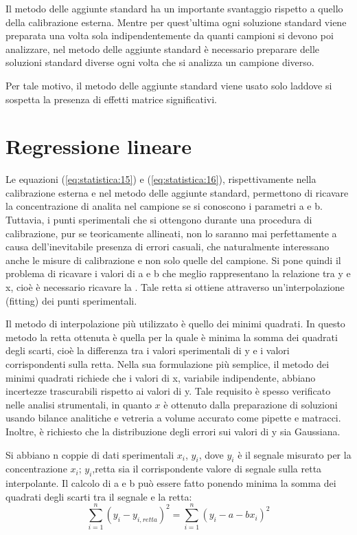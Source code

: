 Il metodo delle aggiunte standard ha un importante svantaggio rispetto a quello della calibrazione esterna. Mentre per quest'ultima ogni soluzione standard viene preparata una volta sola indipendentemente da quanti campioni si devono poi analizzare, nel metodo delle aggiunte standard è necessario preparare delle soluzioni standard diverse ogni volta che si analizza un campione diverso.

Per tale motivo, il metodo delle aggiunte standard viene usato solo laddove si sospetta la presenza di effetti matrice significativi.

\section{Regressione lineare}

Le equazioni (\ref{eq:statistica:15}) e (\ref{eq:statistica:16}), rispettivamente nella calibrazione esterna e nel metodo delle aggiunte standard, permettono di ricavare la concentrazione di analita nel campione se si conoscono i parametri a e b. Tuttavia, i punti sperimentali che si ottengono durante una procedura di calibrazione, pur se teoricamente allineati, non lo saranno mai perfettamente a causa dell'inevitabile presenza di errori casuali, che naturalmente interessano anche le misure di calibrazione e non solo quelle del campione. Si pone quindi il problema di ricavare i valori di a e b che meglio rappresentano la relazione tra y e x, cioè è necessario ricavare la . Tale retta si ottiene attraverso un'interpolazione (fitting) dei punti sperimentali.

Il metodo di interpolazione più utilizzato è quello dei minimi quadrati. In questo metodo la retta ottenuta è quella per la quale è minima la somma dei quadrati degli scarti, cioè la differenza tra i valori sperimentali di y e i valori corrispondenti sulla retta. Nella sua formulazione più semplice, il metodo dei minimi quadrati richiede che i valori di x, variabile indipendente, abbiano incertezze trascurabili rispetto ai valori di y. Tale requisito è spesso verificato nelle analisi strumentali, in quanto $x$ è ottenuto dalla preparazione di soluzioni usando bilance analitiche e vetreria a volume accurato come pipette e matracci. Inoltre, è richiesto che la distribuzione degli errori sui valori di y sia Gaussiana.

Si abbiano n coppie di dati sperimentali $x_i$, $y_i$, dove $y_i$ è il segnale misurato per la concentrazione $x_i$; $y_i$,retta sia il corrispondente valore di segnale sulla retta interpolante. Il calcolo di a e b può essere fatto ponendo minima la somma dei quadrati degli scarti tra il segnale e la retta:
\begin{equation} \label{eq:statistica:17}
\sum_{i=1}^n (y_i - y_{i,retta})^2 = \sum_{i=1}^n (y_i - a -bx_i)^2
\end{equation}

